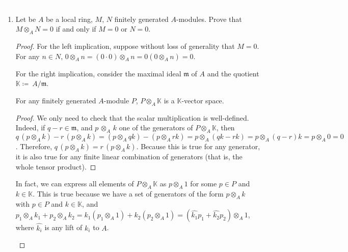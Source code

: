 \begin{problem}\textcolor{white}{.}

    \begin{enumerate}[label=(\theproblem.\arabic*),ref=\theproblem.\arabic*]
        \item Let be $A$ be a local ring, $M$, $N$ finitely generated $A$-modules.
        Prove that $M \otimes_A N = 0$ if and only if $M = 0$ or $N = 0$.
            \begin{sol}
                \begin{proof}
                    For the left implication, suppose without loss of generality that $M = 0$.
                    For any $n \in N$, $0 \otimes_A n = (0\cdot0) \otimes_A n = 0(0 \otimes_A n) = 0$.

                    For the right implication, consider the maximal ideal $\mathfrak{m}$ of $A$
                    and the quotient $\mathbb{K}\coloneqq~A/\mathfrak{m}$.
                    \begin{claim}
                        For any finitely generated $A$-module $P$, 
                        $P \otimes_A \mathbb{K}$ is a $\mathbb{K}$-vector space.
                        \begin{proof}
                            We only need to check that the scalar multiplication is well-defined.
                            Indeed, if $q-r \in \mathfrak{m}$, and $p\,\otimes_A\,k$ one of the generators of $P \otimes_A \mathbb{K}$,
                            then $q\,(p \otimes_A k) - r\,(p \otimes_A k) =
                            (p \otimes_A qk) - (p \otimes_A rk) =
                            p \otimes_A (qk - rk) =
                            p \otimes_A (q-r)k =
                            p \otimes_A 0 = 0$.
                            Therefore, $ q\,(p \otimes_A k) = r\,(p \otimes_A k)$.
                            Because this is true for any generator, it is also true for any finite linear combination of generators (that is, the whole tensor product).
                        \end{proof}
                    \end{claim}

                    \begin{rk}
                        In fact, we can express all elements of $P \otimes_A \mathbb{K}$ as $p \otimes_A 1$
                        for some $p \in P$ and $k \in \mathbb{K}$.
                        This is true because we have a set of generators
                        of the form $p \otimes_A k$ with $p \in P$ and $k \in \mathbb{K}$, and
                        $p_1 \otimes_A k_1 + p_2 \otimes_A k_2 =
                        k_1 (p_1 \otimes_A 1 ) + k_2 (p_2 \otimes_A 1) =
                        (\widehat{k_1} p_1 + \widehat{k_2} p_2) \otimes_A 1$,
                        where $\widehat{k_i}$ is any lift of $k_i$ to $A$.
                    \end{rk}


\end{proof}
\end{sol}
\end{enumerate}
\end{problem}
